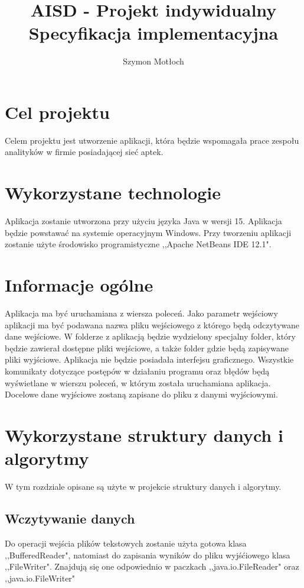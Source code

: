 \documentclass[12pt]{article}
\begin{document}
\begin{titlepage}

\title{AISD - Projekt indywidualny \\
Specyfikacja implementacyjna 
}

\author{Szymon Motłoch}
\maketitle
\end{titlepage}

\section{Cel projektu}
\qquad Celem projektu jest utworzenie aplikacji, która będzie wspomagała prace zespołu analityków w firmie posiadającej sieć aptek. 

\section{Wykorzystane technologie}
\qquad Aplikacja zostanie utworzona przy użyciu języka Java w wersji 15. Aplikacja będzie powstawać na systemie operacyjnym Windows. Przy tworzeniu aplikacji zostanie użyte środowisko programistyczne ,,Apache NetBeans IDE 12.1".

\section{Informacje ogólne}
\qquad Aplikacja ma być uruchamiana z wiersza poleceń. Jako parametr wejściowy aplikacji ma być podawana nazwa pliku wejściowego z którego będą odczytywane dane wejściowe. W folderze z aplikacją będzie wydzielony specjalny folder, który będzie zawierał dostępne pliki wejściowe, a także folder gdzie będą zapisywane pliki wyjściowe. Aplikacja nie będzie posiadała interfejsu graficznego. Wszystkie komunikaty dotyczące postępów w działaniu programu oraz błędów  będą wyświetlane w wierszu poleceń, w którym została uruchamiana aplikacja. Docelowe dane wyjściowe zostaną zapisane do pliku z danymi wyjściowymi.

\section{Wykorzystane struktury danych i algorytmy}
W tym rozdziale opisane są użyte w projekcie struktury danych i algorytmy.
\subsection{Wczytywanie danych}
\qquad Do operacji wejścia plików tekstowych zostanie użyta gotowa klasa ,,BufferedReader", natomiast do zapisania wyników do pliku wyjśćiowego klasa ,,FileWriter". Znajdują się one odpowiednio w paczkach ,,java.io.FileReader" oraz ,,java.io.FileWriter" \\
\qquad
\end{document}
